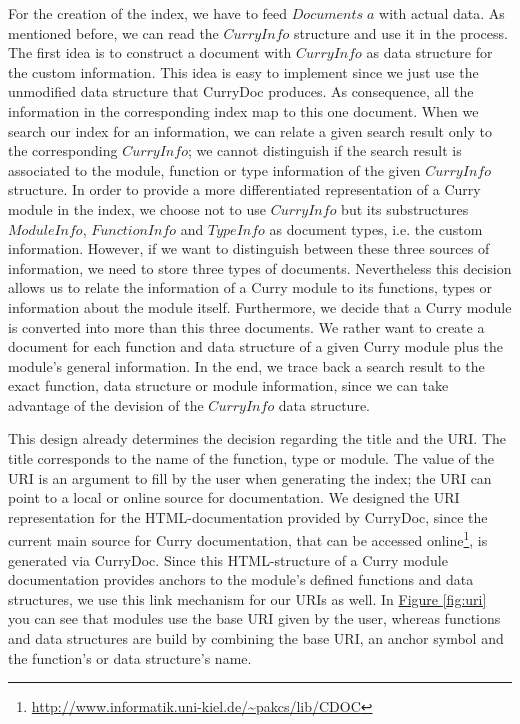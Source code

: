 \documentclass[%
	pdftex,%
	a4paper,%
	oneside,%
	chapterprefix,%
	headsepline,%
	12pt%
]{scrbook}
\newcommand{\Conid}[1]{\mathit{#1}}
\newcommand{\Varid}[1]{\mathit{#1}}
\begin{document}
For the creation of the index, we have to feed \ensuremath{\Conid{Documents}\;\Varid{a}} with
actual data. %
As mentioned before, we can read the \ensuremath{\Conid{CurryInfo}} structure and use it
in the process. %
The first idea is to construct a document with \ensuremath{\Conid{CurryInfo}} as data
structure for the custom information. %
This idea is easy to implement since we just use the unmodified data
structure that CurryDoc produces. %
As consequence, all the information in the corresponding index map to
this one document. %
When we search our index for an information, we can relate a given
search result only to the corresponding \ensuremath{\Conid{CurryInfo}}; we cannot
distinguish if the search result is associated to the module, function
or type information of the given \ensuremath{\Conid{CurryInfo}} structure. %
In order to provide a more differentiated representation of a Curry
module in the index, we choose not to use \ensuremath{\Conid{CurryInfo}} but its
substructures \ensuremath{\Conid{ModuleInfo}}, \ensuremath{\Conid{FunctionInfo}} and \ensuremath{\Conid{TypeInfo}} as document
types, i.e. the custom information. %
However, if we want to distinguish between these three sources of
information, we need to store three types of documents. %
Nevertheless this decision allows us to relate the information of a
Curry module to its functions, types or information about the module
itself. %
Furthermore, we decide that a Curry module is converted into more than
this three documents. %
We rather want to create a document for each function and data
structure of a given Curry module plus the module's general
information. %
In the end, we trace back a search result to the exact function, data
structure or module information, since we can take advantage of the
devision of the \ensuremath{\Conid{CurryInfo}} data structure. %

This design already determines the decision regarding the title and
the URI. %
The title corresponds to the name of the function, type or module. %
The value of the URI is an argument to fill by the user when
generating the index; the URI can point to a local or online source
for documentation. %
We designed the URI representation for the HTML-documentation provided
by CurryDoc, since the current main source for Curry documentation,
that can be accessed
online\footnote{\url{http://www.informatik.uni-kiel.de/~pakcs/lib/CDOC}},
is generated via CurryDoc. %
Since this HTML-structure of a Curry module documentation provides
anchors to the module's defined functions and data structures, we use
this link mechanism for our URIs as well. %
In \hyperref[fig:uri]{Figure \ref{fig:uri}} you can see that modules
use the base URI given by the user, whereas functions and data
structures are build by combining the base URI, an anchor symbol and
the function's or data structure's name.
\end{document}
